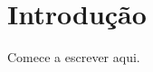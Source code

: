 \documentclass[12pt]{article}
\title{$titulo}
\author{$autor}
\date{}
\begin{document}
\maketitle

\begin{abstract}
Escreva aqui um resumo curto do artigo: o problema, o que foi feito e o principal resultado.
\end{abstract}

\section{Introdução}

Comece a escrever aqui.
\end{document}
